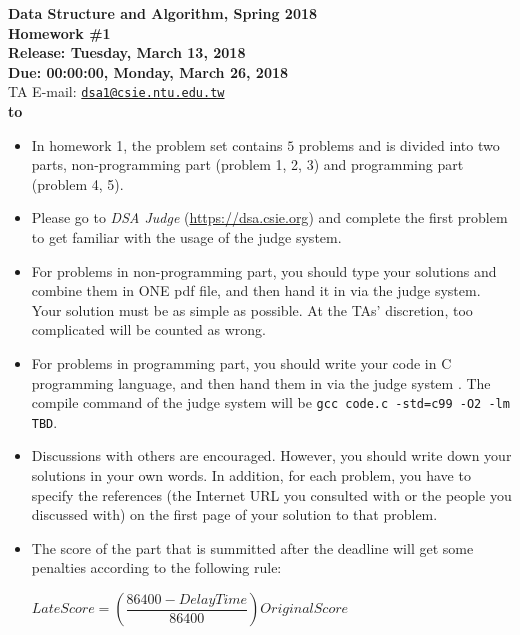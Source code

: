 \documentclass[12pt,a4paper]{report}
\theoremstyle{definition}
\theoremstyle{definition}
\def\headline#1{\hbox to \hsize{\hrulefill\quad\lower.3em\hbox{#1}\quad\hrulefill}}
\def\headline#1{\hbox to \hsize{\hrulefill\quad\lower.3em\hbox{#1}\quad\hrulefill}}
\begin{document}
\begin{center}
\textbf{\Large Data Structure and Algorithm, Spring 2018\\}
\textbf{\Large Homework \#1\\} 
\vspace{5pt}
\textbf{Release: Tuesday, March 13, 2018}\\
\textbf{Due: 00:00:00, Monday, March 26, 2018}\\
TA E-mail: \href{mailto:dsa1@csie.ntu.edu.tw}{\texttt{dsa1@csie.ntu.edu.tw}}\\
\vspace{5pt}
\textbf{\headline{Rules and Instructions}}
\begin{itemize}
    \item In homework 1, the problem set contains $5$ problems and is divided into two parts, non-programming part (problem 1, 2, 3)  and programming part (problem 4, 5). 
    \item Please go to \textit{DSA Judge} (\url{https://dsa.csie.org}) and complete the first problem to get familiar with the usage of the judge system.
    \item For problems in non-programming part, you should type your solutions and combine them in ONE pdf file, and then hand it in via the judge system. Your solution must be as simple as possible. At the TAs' discretion, too complicated will be counted as wrong.
    \item For problems in programming part, you should write your code in C programming language, and then hand them in via the judge system . The compile command of the judge system will be \texttt{gcc code.c -std=c99 -O2 -lm TBD}.
    \item Discussions with others are encouraged. However, you should write down your solutions in your own words. In addition, for each problem, you have to specify the references (the Internet URL you consulted with or the people you discussed with) on the first page of your solution to that problem.
    \item The score of the part that is summitted after the deadline will get some penalties according to the following rule:
    \begin{center}
        $LateScore = (\dfrac{86400-DelayTime}{86400})OriginalScore$
    \end{center}
\end{itemize}

\end{center}
\newpage
\end{document}
